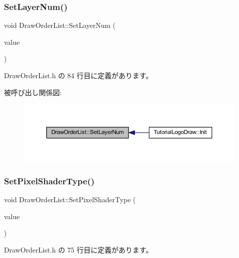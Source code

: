 \subsubsection{\texorpdfstring{Set\+Layer\+Num()}{SetLayerNum()}}
{\footnotesize\ttfamily void Draw\+Order\+List\+::\+Set\+Layer\+Num (\begin{DoxyParamCaption}\item[{int}]{value }\end{DoxyParamCaption})\hspace{0.3cm}{\ttfamily [inline]}}



 Draw\+Order\+List.\+h の 84 行目に定義があります。

被呼び出し関係図\+:\nopagebreak
\begin{figure}[H]
\begin{center}
\leavevmode
\includegraphics[width=350pt]{class_draw_order_list_a5559a24f4d87d9d087d9daabed9a11f3_icgraph}
\end{center}
\end{figure}
\mbox{\label{class_draw_order_list_a0fd7f50f4078001983f88014d59f8f29}} 
\subsubsection{\texorpdfstring{Set\+Pixel\+Shader\+Type()}{SetPixelShaderType()}}
{\footnotesize\ttfamily void Draw\+Order\+List\+::\+Set\+Pixel\+Shader\+Type (\begin{DoxyParamCaption}\item[{\mbox{\hyperlink{class_shader_manager_a7d15d773b3c6a99dd7086c45c8b0be5f}{Shader\+Manager\+::\+Pixel\+Shader\+Type}}}]{value }\end{DoxyParamCaption})\hspace{0.3cm}{\ttfamily [inline]}}



 Draw\+Order\+List.\+h の 75 行目に定義があります。

